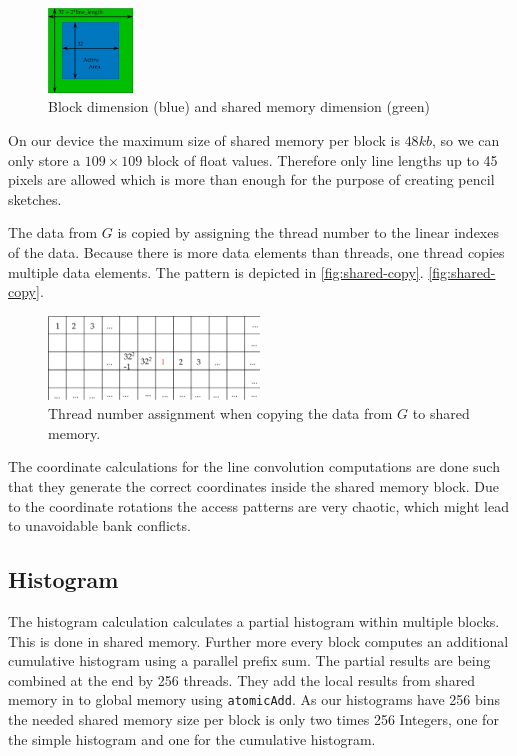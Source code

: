 \begin{figure}[htb]
  \centering
  \includegraphics[width=0.2\textwidth]{images/shared-memory.png}
  \caption{Block dimension (blue) and shared memory dimension (green)}
  \label{fig:shared-memory}
\end{figure}

On our device the maximum size of shared memory per block is $48kb$, so we can
only store a $109\times109$ block of float values. Therefore only line
lengths up to 45 pixels are allowed which is more than enough for the purpose of
creating pencil sketches.

The data from $G$ is copied by assigning the thread number to the linear
indexes of the data. Because there is more data elements than threads, one
thread copies multiple data elements. The pattern is depicted in
\autoref{fig:shared-copy}.  \autoref{fig:shared-copy}.
\begin{figure}[htb]
  \centering
  \includegraphics[width=0.5\textwidth]{images/shared-copy.png}
  \caption{Thread number assignment when copying the data from $G$ to shared memory.}
  \label{fig:shared-copy}
\end{figure}

The coordinate calculations for the line convolution computations are done such
that they generate the correct coordinates inside the shared memory block. Due to
the coordinate rotations the access patterns are very chaotic, which might lead
to unavoidable bank conflicts.



\subsection{Histogram}
The histogram calculation calculates a partial histogram within multiple blocks.
This is done in shared memory. Further more every block computes an additional
cumulative histogram using a parallel prefix sum. The partial results are being
combined at the end by 256 threads. They add the local results from shared
memory in to global memory using \texttt{atomicAdd}. As our histograms have
256 bins the needed shared memory size per block is only two times 256 Integers,
one for the simple histogram and one for the cumulative histogram.

